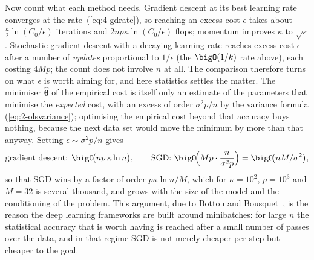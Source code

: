 Now count what each method needs.  Gradient descent at its best learning
rate converges at the rate~(\ref{eq:4-gdrate}), so reaching an excess cost
$\epsilon$ takes about $\frac{\kappa}{2}\ln(C_0/\epsilon)$ iterations and
$2np\kappa\ln(C_0/\epsilon)$ flops; momentum improves $\kappa$ to
$\sqrt{\kappa}$.  Stochastic gradient descent with a decaying learning rate
reaches excess cost $\epsilon$ after a number of \emph{updates} proportional
to $1/\epsilon$ (the $\bigO(1/k)$ rate above), each costing $4Mp$; the count
does not involve $n$ at all.  The comparison therefore turns on what
$\epsilon$ is worth aiming for, and here statistics settles the matter.  The
minimiser $\hat{\bm{\theta}}$ of the empirical cost is itself only an
estimate of the parameters that minimise the \emph{expected} cost, with an
excess of order $\sigma^{2}p/n$ by the variance formula
(\ref{eq:2-olsvariance}); optimising the empirical cost beyond that accuracy
buys nothing, because the next data set would move the minimum by more than
that anyway.  Setting $\epsilon\sim\sigma^{2}p/n$ gives
\begin{equation}
  \text{gradient descent: } \bigO\!\bigl(np\,\kappa\ln n\bigr),
  \qquad
  \text{SGD: } \bigO\!\Bigl(Mp\cdot\frac{n}{\sigma^{2}p}\Bigr)=\bigO\!\bigl(nM/\sigma^{2}\bigr),
  \label{eq:4-flopcompare}
\end{equation}
so that SGD wins by a factor of order $p\kappa\ln n/M$, which for
$\kappa=10^{2}$, $p=10^{3}$ and $M=32$ is several thousand, and grows with
the size of the model and the conditioning of the problem.  This argument,
due to Bottou and Bousquet~\cite{bottou2008}, is the reason the deep
learning frameworks are built around minibatches: for large $n$ the
statistical accuracy that is worth having is reached after a small number of
passes over the data, and in that regime SGD is not merely cheaper per step
but cheaper to the goal.

